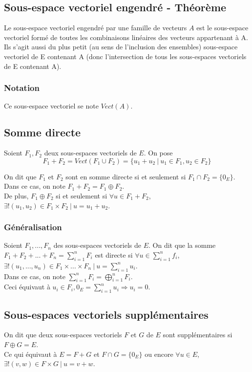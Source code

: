 \documentclass[a4paper,10pt]{book} %
\newcommand{\sevs}{sous-espaces vectoriels }
\newcommand{\sev}{sous-espace vectoriel }
\newcommand{\tq}{~|~}
\newcommand{\displayAmath}{\displaystyle}
\begin{document}
\subsection{Sous-espace vectoriel engendré - Théorème}
Le \sev engendré par une famille de vecteurs $A$ est le \sev formé de toutes les combinaisons linéaires des vecteurs appartenant à A.\\

Ils s'agit aussi du plus petit (au sens de l'inclusion des ensembles) \sev de E contenant A (donc l'intersection de tous les \sevs de E contenant A).

\subsubsection{Notation}
Ce \sev se note $Vect(A)$.

\subsection{Somme directe}
Soient $F_1,F_2$ deux \sevs de $E$. On pose \\
$$F_1+F_2=Vect(F_1\cup F_2)=\{ u_1+u_2\tq u_1\in F_1, u_2\in F_2\}$$

On dit que $F_1$ et $F_2$ sont en somme directe si et seulement si $F_1\cap F_2 =\{0_E\}$.\\
Dans ce cas, on note $F_1+F_2=F_1 \oplus F_2$.\\

De plus, $F_1\oplus F_2$ si et seulement si $\forall u\in F_1+F_2$, $\exists! (u_1,u_2)\in F_1\times F_2\tq u=u_1+u_2$.

\subsubsection{Généralisation}
Soient $F_1,...,F_n$ des \sevs de $E$. On dit que la somme $\displayAmath F_1+F_2+...+F_n=\sum_{i=1}^n F_i$ est directe si $\displayAmath\forall u\in \sum_{i=1}^n f_i$, $\displayAmath\exists!(u_1,...,u_n)\in F_1 \times ...\times F_n\tq u=\sum_{i=1}^nu_i$.\\

Dans ce cas, on note $\displayAmath\sum_{i=1}^n F_i=\bigoplus_{i=1}^n F_i$.\\

Ceci équivaut à $\displayAmath u_i\in F_i, 0_E=\sum_{i=1}^n u_i \Rightarrow u_i=0$.

\subsection{Sous-espaces vectoriels supplémentaires}
On dit que deux \sevs $F$ et $G$ de $E$ sont supplémentaires si $F\oplus G=E$.\\
Ce qui équivaut à $E=F+G$ et $F\cap G=\{0_E\}$ ou encore $\forall u\in E$, $\exists! (v,w)\in F\times G \tq u=v+w$.
\end{document}
